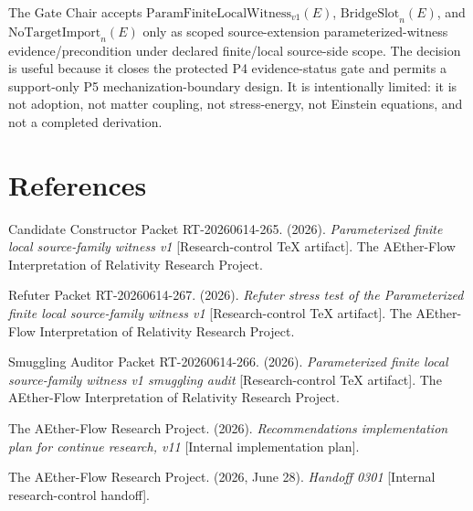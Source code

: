 \documentclass[11pt]{article}
\newcommand{\ParamWitness}{\mathrm{ParamFiniteLocalWitness}_{v1}}
\newcommand{\BridgeSlot}{\mathrm{BridgeSlot}_{n}}
\newcommand{\NoTargetImport}{\mathrm{NoTargetImport}_{n}}
\begin{document}
The Gate Chair accepts \(\ParamWitness(E)\), \(\BridgeSlot(E)\), and
\(\NoTargetImport(E)\) only as scoped source-extension parameterized-witness
evidence/precondition under declared finite/local source-side scope. The
decision is useful because it closes the protected P4 evidence-status gate and
permits a support-only P5 mechanization-boundary design. It is intentionally
limited: it is not adoption, not matter coupling, not stress-energy, not
Einstein equations, and not a completed derivation.

\section*{References}

Candidate Constructor Packet RT-20260614-265. (2026). \emph{Parameterized
finite local source-family witness v1} [Research-control TeX artifact]. The
AEther-Flow Interpretation of Relativity Research Project.

Refuter Packet RT-20260614-267. (2026). \emph{Refuter stress test of the
Parameterized finite local source-family witness v1} [Research-control TeX
artifact]. The AEther-Flow Interpretation of Relativity Research Project.

Smuggling Auditor Packet RT-20260614-266. (2026). \emph{Parameterized finite
local source-family witness v1 smuggling audit} [Research-control TeX
artifact]. The AEther-Flow Interpretation of Relativity Research Project.

The AEther-Flow Research Project. (2026). \emph{Recommendations implementation
plan for continue research, v11} [Internal implementation plan].

The AEther-Flow Research Project. (2026, June 28). \emph{Handoff 0301}
[Internal research-control handoff].
\end{document}
